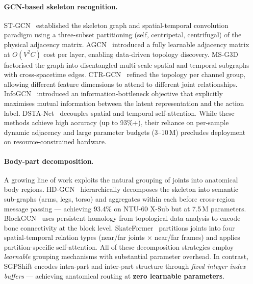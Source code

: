 \documentclass[sigconf,screen,review,anonymous]{acmart}
\begin{document}
\paragraph{GCN-based skeleton recognition.}
ST-GCN~\cite{stgcn} established the skeleton graph and spatial-temporal
convolution paradigm using a three-subset partitioning (self, centripetal,
centrifugal) of the physical adjacency matrix.
AGCN~\cite{agcn} introduced a fully learnable adjacency matrix at
$O(V^2C)$ cost per layer, enabling data-driven topology discovery.
MS-G3D~\cite{msg3d} factorised the graph into disentangled multi-scale
spatial and temporal subgraphs with cross-spacetime edges.
CTR-GCN~\cite{ctrgcn} refined the topology per channel group, allowing
different feature dimensions to attend to different joint relationships.
InfoGCN~\cite{infogcn} introduced an information-bottleneck objective
that explicitly maximises mutual information between the latent
representation and the action label.
DSTA-Net~\cite{dstanet} decouples spatial and temporal self-attention.
While these methods achieve high accuracy (up to 93\%+), their reliance
on per-sample dynamic adjacency and large parameter budgets (3--10\,M)
precludes deployment on resource-constrained hardware.

\paragraph{Body-part decomposition.}
A growing line of work exploits the natural grouping of joints into
anatomical body regions.
HD-GCN~\cite{hdgcn} hierarchically decomposes the skeleton into semantic
sub-graphs (arms, legs, torso) and aggregates within each before
cross-region message passing --- achieving 93.4\% on NTU-60 X-Sub but
at 7.5\,M parameters.
BlockGCN~\cite{blockgcn} uses persistent homology from topological data
analysis to encode bone connectivity at the block level.
SkateFormer~\cite{skateformer} partitions joints into four
spatial-temporal relation types (near/far joints $\times$ near/far
frames) and applies partition-specific self-attention.
All of these decomposition strategies employ \emph{learnable} grouping
mechanisms with substantial parameter overhead.
In contrast, SGPShift encodes intra-part and inter-part structure through
\emph{fixed integer index buffers} --- achieving anatomical routing at
\textbf{zero learnable parameters}.
\end{document}
